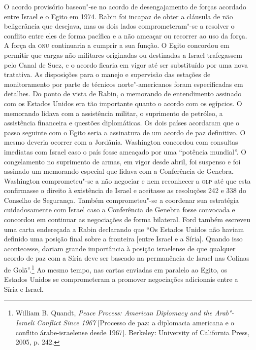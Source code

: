 O acordo provisório baseou"-se no acordo de desengajamento de forças
acordado entre Israel e o Egito em 1974. Rabin foi incapaz de obter a
cláusula de não beligerância que desejava, mas os dois lados
comprometeram"-se a resolver o conflito entre eles de forma pacífica e a
não ameaçar ou recorrer ao uso da força. A força da \textsc{onu} continuaria a
cumprir a sua função. O Egito concordou em permitir que cargas
não militares originadas ou destinadas a Israel trafegassem pelo Canal
de Suez, e o acordo ficaria em vigor até ser substituído por uma nova
tratativa. As disposições para o manejo e supervisão das estações de
monitoramento por parte de técnicos norte"-americanos foram especificadas
em detalhes. Do ponto de vista de Rabin, o memorando de entendimento
assinado com os Estados Unidos era tão importante quanto o acordo com os
egípcios. O memorando lidava com a assistência militar, o suprimento de
petróleo, a assistência financeira e questões diplomáticas. Os dois
países acordaram que o passo seguinte com o Egito seria a assinatura de
um acordo de paz definitivo. O mesmo deveria ocorrer com a Jordânia.
Washington concordou com consultas imediatas com Israel caso o país
fosse ameaçado por uma ``potência mundial''. O congelamento no
suprimento de armas, em vigor desde abril, foi suspenso e foi assinado
um memorando especial que lidava com a Conferência de Genebra.
Washington comprometeu"-se a não negociar e nem reconhecer a \textsc{olp} até que
esta confirmasse o direito à existência de Israel e aceitasse as
resoluções 242 e 338 do Conselho de Segurança. Também comprometeu"-se a
coordenar sua estratégia cuidadosamente com Israel caso a Conferência de
Genebra fosse convocada e concordou em continuar as negociações de forma
bilateral. Ford também escreveu uma carta endereçada a Rabin declarando
que ``Os Estados Unidos não haviam definido uma posição final sobre a
fronteira {[}entre Israel e a Síria{]}. Quando isso acontecesse, dariam grande
importância à posição israelense de que qualquer acordo de paz com a
Síria deve ser baseado na permanência de Israel nas Colinas de
Golã''.\footnote{William B. Quandt, \textit{Peace Process: American Diplomacy and the
Arab"-Israeli Conflict Since 1967} {[}Processo de paz: a diplomacia americana e o conflito árabe-israelense desde 1967{]}. Berkeley: University of California
Press, 2005, p. 242.} Ao mesmo tempo, nas cartas enviadas em paralelo ao
Egito, os Estados Unidos se comprometeram a promover negociações
adicionais entre a Síria e Israel.

